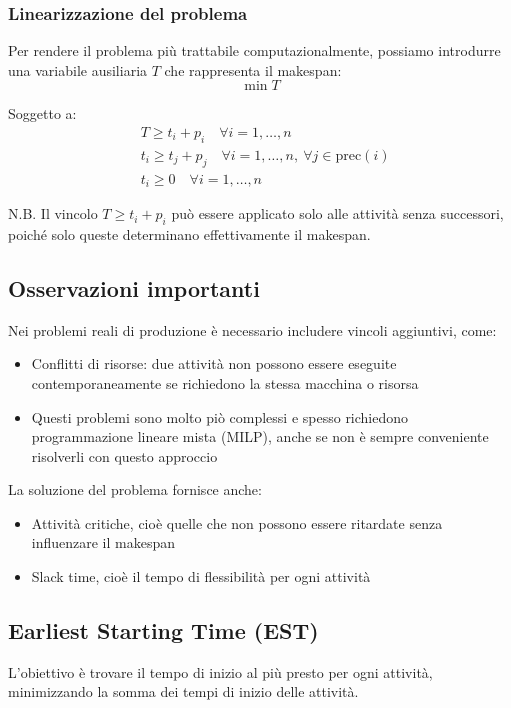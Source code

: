 \subsubsection{Linearizzazione del problema}
Per rendere il problema più trattabile computazionalmente, possiamo introdurre una variabile ausiliaria $T$ che rappresenta il makespan:
\[ 
\min T
\]

Soggetto a:
\[ 
\begin{aligned}
& T \geq t_i + p_i \quad \forall i = 1,\dots,n \\
& t_i \geq t_j + p_j \quad \forall i = 1,\dots,n,\ \forall j \in \text{prec}(i) \\
& t_i \geq 0 \quad \forall i = 1,\dots,n
\end{aligned}
\]

N.B. Il vincolo $T \geq t_i + p_i$ può essere applicato solo alle attività 
senza successori, poiché solo queste determinano effettivamente il makespan.

\subsection{Osservazioni importanti}
Nei problemi reali di produzione è necessario includere vincoli aggiuntivi, come:
\begin{itemize}
    \item Conflitti di risorse: due attività non possono essere eseguite contemporaneamente se richiedono la stessa macchina o risorsa
    \item Questi problemi sono molto piò complessi e spesso richiedono programmazione lineare mista (MILP), anche se non è sempre conveniente risolverli con questo approccio
\end{itemize}

La soluzione del problema fornisce anche:
\begin{itemize}
    \item Attività critiche, cioè quelle che non possono essere ritardate senza influenzare il makespan
    \item Slack time, cioè il tempo di flessibilità per ogni attività
\end{itemize}

\subsection{Earliest Starting Time (EST)}

L'obiettivo è trovare il tempo di inizio al più presto per ogni attività, 
minimizzando la somma dei tempi di inizio delle attività.

